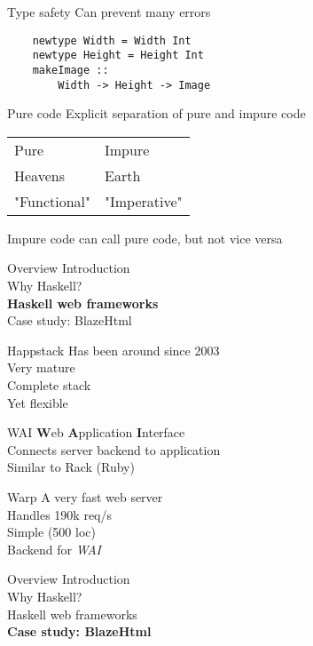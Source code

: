 \documentclass[20pt]{beamer}
\begin{document}
\begin{frame}[fragile]{Type safety}
    Can prevent many errors
    \begin{lstlisting}
    newtype Width = Width Int
    newtype Height = Height Int
    makeImage ::
        Width -> Height -> Image
    \end{lstlisting}
\end{frame}

\begin{frame}{Pure code}
    Explicit separation of pure and impure code \\
    \vspace{5mm}
    \begin{tabular}{l|l}
        Pure         & Impure \\
        Heavens      & Earth  \\
        "Functional" & "Imperative"
    \end{tabular}
    \newline
    \vspace{5mm}

    Impure code can call pure code, but not vice versa
\end{frame}


\begin{frame}{Overview}
    Introduction \\
    Why Haskell? \\
    \textbf{Haskell web frameworks} \\
    Case study: BlazeHtml
\end{frame}

\begin{frame}{Happstack}
    Has been around since 2003 \\
    Very mature \\
    Complete stack \\
    Yet flexible
\end{frame}

\begin{frame}{WAI}
    \textbf{W}eb \textbf{A}pplication \textbf{I}nterface \\
    Connects server backend to application \\
    Similar to Rack (Ruby) \\
\end{frame}

\begin{frame}{Warp}
    A very fast web server \\
    Handles 190k req/s \\
    Simple (500 loc) \\
    Backend for \emph{WAI} \\
\end{frame}


\begin{frame}{Overview}
    Introduction \\
    Why Haskell? \\
    Haskell web frameworks \\
    \textbf{Case study: BlazeHtml} \\
\end{frame}
\end{document}
